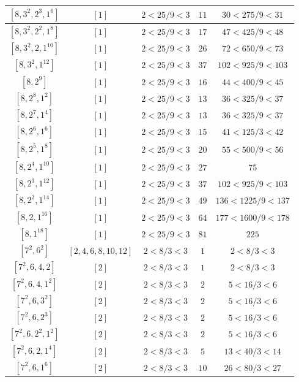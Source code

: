 \documentclass{article}%
\begin{document}
\begin{center}
\begin{longtable}{||c|c|c|c|c||}
$[8, 3^{2}, 2^{3}, 1^{6}]$ & $[1]$ & $2 < 25/9 < 3$ & $11$ & $30 < 275/9 < 31$ \\ \hline 
$[8, 3^{2}, 2^{2}, 1^{8}]$ & $[1]$ & $2 < 25/9 < 3$ & $17$ & $47 < 425/9 < 48$ \\ \hline 
$[8, 3^{2}, 2, 1^{10}]$ & $[1]$ & $2 < 25/9 < 3$ & $26$ & $72 < 650/9 < 73$ \\ \hline 
$[8, 3^{2}, 1^{12}]$ & $[1]$ & $2 < 25/9 < 3$ & $37$ & $102 < 925/9 < 103$ \\ \hline 
$[8, 2^{9}]$ & $[1]$ & $2 < 25/9 < 3$ & $16$ & $44 < 400/9 < 45$ \\ \hline 
$[8, 2^{8}, 1^{2}]$ & $[1]$ & $2 < 25/9 < 3$ & $13$ & $36 < 325/9 < 37$ \\ \hline 
$[8, 2^{7}, 1^{4}]$ & $[1]$ & $2 < 25/9 < 3$ & $13$ & $36 < 325/9 < 37$ \\ \hline 
$[8, 2^{6}, 1^{6}]$ & $[1]$ & $2 < 25/9 < 3$ & $15$ & $41 < 125/3 < 42$ \\ \hline 
$[8, 2^{5}, 1^{8}]$ & $[1]$ & $2 < 25/9 < 3$ & $20$ & $55 < 500/9 < 56$ \\ \hline 
$[8, 2^{4}, 1^{10}]$ & $[1]$ & $2 < 25/9 < 3$ & $27$ & $75$ \\ \hline 
$[8, 2^{3}, 1^{12}]$ & $[1]$ & $2 < 25/9 < 3$ & $37$ & $102 < 925/9 < 103$ \\ \hline 
$[8, 2^{2}, 1^{14}]$ & $[1]$ & $2 < 25/9 < 3$ & $49$ & $136 < 1225/9 < 137$ \\ \hline 
$[8, 2, 1^{16}]$ & $[1]$ & $2 < 25/9 < 3$ & $64$ & $177 < 1600/9 < 178$ \\ \hline 
$[8, 1^{18}]$ & $[1]$ & $2 < 25/9 < 3$ & $81$ & $225$ \\ \hline 
$[7^{2}, 6^{2}]$ & $[2, 4, 6, 8, 10, 12]$ & $2 < 8/3 < 3$ & $1$ & $2 < 8/3 < 3$ \\ \hline 
$[7^{2}, 6, 4, 2]$ & $[2]$ & $2 < 8/3 < 3$ & $1$ & $2 < 8/3 < 3$ \\ \hline 
$[7^{2}, 6, 4, 1^{2}]$ & $[2]$ & $2 < 8/3 < 3$ & $2$ & $5 < 16/3 < 6$ \\ \hline 
$[7^{2}, 6, 3^{2}]$ & $[2]$ & $2 < 8/3 < 3$ & $2$ & $5 < 16/3 < 6$ \\ \hline 
$[7^{2}, 6, 2^{3}]$ & $[2]$ & $2 < 8/3 < 3$ & $2$ & $5 < 16/3 < 6$ \\ \hline 
$[7^{2}, 6, 2^{2}, 1^{2}]$ & $[2]$ & $2 < 8/3 < 3$ & $2$ & $5 < 16/3 < 6$ \\ \hline 
$[7^{2}, 6, 2, 1^{4}]$ & $[2]$ & $2 < 8/3 < 3$ & $5$ & $13 < 40/3 < 14$ \\ \hline 
$[7^{2}, 6, 1^{6}]$ & $[2]$ & $2 < 8/3 < 3$ & $10$ & $26 < 80/3 < 27$ \\ \hline 

\end{longtable}
\end{center}
\end{document}
